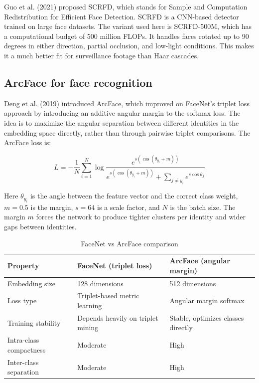 \documentclass[12pt,a4paper]{report}
\begin{document}
Guo et al. (2021) proposed SCRFD, which stands for Sample and Computation Redistribution for Efficient Face Detection. SCRFD is a CNN-based detector trained on large face datasets. The variant used here is SCRFD-500M, which has a computational budget of 500 million FLOPs. It handles faces rotated up to 90 degrees in either direction, partial occlusion, and low-light conditions. This makes it a much better fit for surveillance footage than Haar cascades.

\subsection{ArcFace for face recognition}

Deng et al. (2019) introduced ArcFace, which improved on FaceNet's triplet loss approach by introducing an additive angular margin to the softmax loss. The idea is to maximize the angular separation between different identities in the embedding space directly, rather than through pairwise triplet comparisons. The ArcFace loss is:

\[
L = -\frac{1}{N}\sum_{i=1}^{N} \log \frac{e^{s(\cos(\theta_{y_i} + m))}}{e^{s(\cos(\theta_{y_i} + m))} + \sum_{j \neq y_i} e^{s\cos\theta_j}}
\]

Here $\theta_{y_i}$ is the angle between the feature vector and the correct class weight, $m = 0.5$ is the margin, $s = 64$ is a scale factor, and $N$ is the batch size. The margin $m$ forces the network to produce tighter clusters per identity and wider gaps between identities.

\begin{table}[htbp]
\centering
\begin{tabular}{|l|p{5.5cm}|p{5.5cm}|}
\hline
\textbf{Property} & \textbf{FaceNet (triplet loss)} & \textbf{ArcFace (angular margin)} \\
\hline
Embedding size & 128 dimensions & 512 dimensions \\
\hline
Loss type & Triplet-based metric learning & Angular margin softmax \\
\hline
Training stability & Depends heavily on triplet mining & Stable, optimizes classes directly \\
\hline
Intra-class compactness & Moderate & High \\
\hline
Inter-class separation & Moderate & High \\
\hline
\end{tabular}
\caption{FaceNet vs ArcFace comparison}
\label{tab:face_comparison_lit}
\end{table}
\end{document}
